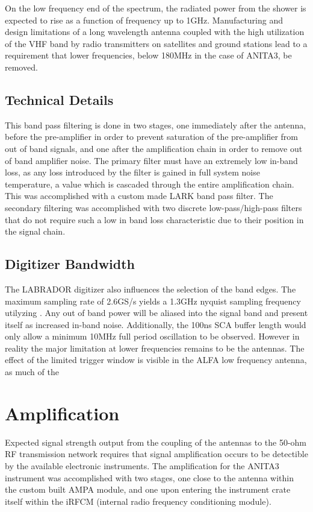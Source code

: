 		On the low frequency end of the spectrum, the radiated power from the shower is expected to rise as a function of frequency up to 1GHz.  Manufacturing and design limitations of a long wavelength antenna coupled with the high utilization of the VHF band by radio transmitters on satellites and ground stations lead to a requirement that lower frequencies, below 180MHz in the case of ANITA3, be removed.
		
	\subsection{Technical Details}
		This band pass filtering is done in two stages, one immediately after the antenna, before the pre-amplifier in order to prevent saturation of the pre-amplifier from out of band signals, and one after the amplification chain in order to remove out of band amplifier noise.  The primary filter must have an extremely low in-band loss, as any loss introduced by the filter is gained in full system noise temperature, a value which is cascaded through the entire amplification chain.  This was accomplished with a custom made LARK band pass filter.  The secondary filtering was accomplished with two discrete low-pass/high-pass filters that do not require such a low in band loss characteristic due to their position in the signal chain.
		
	\subsection{Digitizer Bandwidth}
		The LABRADOR digitizer also influences the selection of the band edges.  The maximum sampling rate of 2.6GS/s yields a 1.3GHz nyquist sampling frequency utilyzing .  Any out of band power will be aliased into the signal band and present itself as increased in-band noise.  Additionally, the 100ns SCA buffer length would only allow a minimum 10MHz full period oscillation to be observed.  However in reality the major limitation at lower frequencies remains to be the antennas.  The effect of the limited trigger window is visible in the ALFA low frequency antenna, as much of the 
		
\section{Amplification}
	Expected signal strength output from the coupling of the antennas to the 50-ohm RF transmission network requires that signal amplification occurs to be detectible by the available electronic instruments.  The amplification for the ANITA3 instrument was accomplished with two stages, one close to the antenna within the custom built AMPA module, and one upon entering the instrument crate itself within the iRFCM (internal radio frequency conditioning module).  
	
